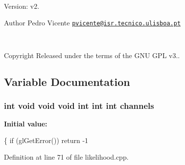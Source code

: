 Version\+: v2. \begin{DoxyAuthor}{Author}
Pedro Vicente \href{mailto:pvicente@isr.tecnico.ulisboa.pt}{\tt pvicente@isr.\+tecnico.\+ulisboa.\+pt}
\end{DoxyAuthor}
~\newline
\begin{DoxyCopyright}{Copyright}
Released under the terms of the G\+NU G\+PL v3.. 
\end{DoxyCopyright}


\subsection{Variable Documentation}
\subsubsection[{\texorpdfstring{channels}{channels}}]{\setlength{\rightskip}{0pt plus 5cm}int void void void int int int channels}\label{likelihood_8cpp_aebab973ae81d008644594c91f0af5843}
{\bfseries Initial value\+:}
\begin{DoxyCode}
\{
    \textcolor{keywordflow}{if} (glGetError())
        \textcolor{keywordflow}{return} -1
\end{DoxyCode}


Definition at line 71 of file likelihood.\+cpp.

